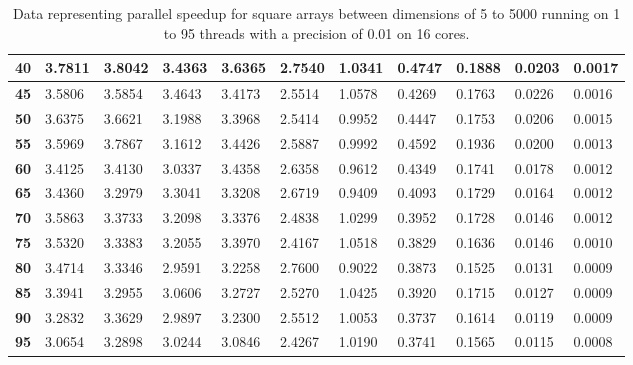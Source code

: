 \begin{table}[ht]
\begin{tabular}{|l|l|l|l|l|l|l|l|l|l|l|}
\textbf{40}      & 3.7811            & 3.8042            & 3.4363            & 3.6365            & 2.7540           & 1.0341           & 0.4747          & 0.1888          & 0.0203          & 0.0017         \\ \hline
\textbf{45}      & 3.5806            & 3.5854            & 3.4643            & 3.4173            & 2.5514           & 1.0578           & 0.4269          & 0.1763          & 0.0226          & 0.0016         \\ \hline
\textbf{50}      & 3.6375            & 3.6621            & 3.1988            & 3.3968            & 2.5414           & 0.9952           & 0.4447          & 0.1753          & 0.0206          & 0.0015         \\ \hline
\textbf{55}      & 3.5969            & 3.7867            & 3.1612            & 3.4426            & 2.5887           & 0.9992           & 0.4592          & 0.1936          & 0.0200          & 0.0013         \\ \hline
\textbf{60}      & 3.4125            & 3.4130            & 3.0337            & 3.4358            & 2.6358           & 0.9612           & 0.4349          & 0.1741          & 0.0178          & 0.0012         \\ \hline
\textbf{65}      & 3.4360            & 3.2979            & 3.3041            & 3.3208            & 2.6719           & 0.9409           & 0.4093          & 0.1729          & 0.0164          & 0.0012         \\ \hline
\textbf{70}      & 3.5863            & 3.3733            & 3.2098            & 3.3376            & 2.4838           & 1.0299           & 0.3952          & 0.1728          & 0.0146          & 0.0012         \\ \hline
\textbf{75}      & 3.5320            & 3.3383            & 3.2055            & 3.3970            & 2.4167           & 1.0518           & 0.3829          & 0.1636          & 0.0146          & 0.0010         \\ \hline
\textbf{80}      & 3.4714            & 3.3346            & 2.9591            & 3.2258            & 2.7600           & 0.9022           & 0.3873          & 0.1525          & 0.0131          & 0.0009         \\ \hline
\textbf{85}      & 3.3941            & 3.2955            & 3.0606            & 3.2727            & 2.5270           & 1.0425           & 0.3920          & 0.1715          & 0.0127          & 0.0009         \\ \hline
\textbf{90}      & 3.2832            & 3.3629            & 2.9897            & 3.2300            & 2.5512           & 1.0053           & 0.3737          & 0.1614          & 0.0119          & 0.0009         \\ \hline
\textbf{95}      & 3.0654            & 3.2898            & 3.0244            & 3.0846            & 2.4267           & 1.0190           & 0.3741          & 0.1565          & 0.0115          & 0.0008         \\ \hline
\end{tabular}
\caption{Data representing parallel speedup for square arrays between dimensions of 5 to 5000 running on 1 to 95 threads with a precision of 0.01 on 16 cores.}
\end{table}